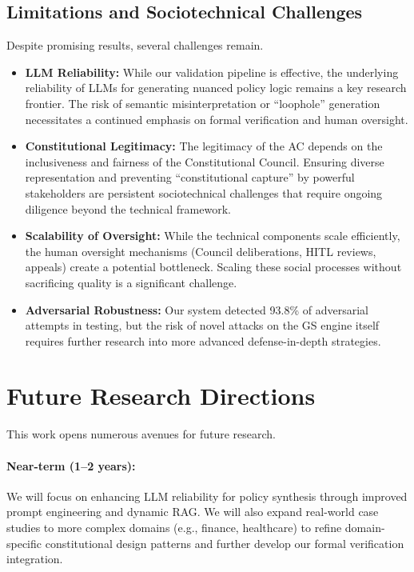 \documentclass[10pt,twocolumn]{article}
\theoremstyle{definition}
\begin{document}
\subsection{Limitations and Sociotechnical Challenges}
Despite promising results, several challenges remain.
\begin{itemize}[leftmargin=*,topsep=2pt,itemsep=2pt,parsep=0pt]
    \item \textbf{LLM Reliability:} While our validation pipeline is effective, the underlying reliability of LLMs for generating nuanced policy logic remains a key research frontier. The risk of semantic misinterpretation or ``loophole'' generation necessitates a continued emphasis on formal verification and human oversight.
    \item \textbf{Constitutional Legitimacy:} The legitimacy of the AC depends on the inclusiveness and fairness of the Constitutional Council. Ensuring diverse representation and preventing ``constitutional capture'' by powerful stakeholders are persistent sociotechnical challenges that require ongoing diligence beyond the technical framework.
    \item \textbf{Scalability of Oversight:} While the technical components scale efficiently, the human oversight mechanisms (Council deliberations, HITL reviews, appeals) create a potential bottleneck. Scaling these social processes without sacrificing quality is a significant challenge.
    \item \textbf{Adversarial Robustness:} Our system detected 93.8\% of adversarial attempts in testing, but the risk of novel attacks on the GS engine itself requires further research into more advanced defense-in-depth strategies.
\end{itemize}

\section{Future Research Directions}
\label{sec:future_work}
This work opens numerous avenues for future research.

\paragraph{Near-term (1--2 years):} We will focus on enhancing LLM reliability for policy synthesis through improved prompt engineering and dynamic RAG. We will also expand real-world case studies to more complex domains (e.g., finance, healthcare) to refine domain-specific constitutional design patterns and further develop our formal verification integration.
\end{document}
